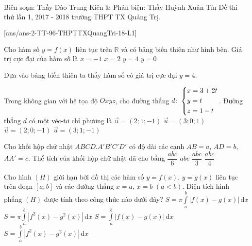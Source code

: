 
	\begin{name}
		{Biên soạn: Thầy Đào Trung Kiên \& Phản biện: Thầy Huỳnh Xuân Tín}
		{Đề thi thử lần 1, 2017 - 2018 trường THPT TX Quảng Trị.}
	\end{name}
	\setcounter{ex}{0}\setcounter{bt}{0}
	[ans/ans-2-TT-96-THPTTXQuangTri-18-L1]
	\begin{ex}%
		\immini
		{
			Cho hàm số $y=f(x)$ liên tục trên $\mathbb{R}$ và có bảng biến thiên như hình bên. Giá trị cực đại của hàm số là
			\choice
			{$x=-1$}
			{$x=2$}
			{\True $y=4$}
			{$y=0$}
		}
		{
		}
		\loigiai
		{
			Dựa vào bảng biến thiên ta thấy hàm số có giá trị cực đại $y=4$.
		}
	\end{ex}
	
	\begin{ex}%
		Trong không gian với hệ tọa độ $Oxyz$, cho đường thẳng $d\colon \left\{\begin{aligned}&x=3+2t\\&y=t\\&z=1-t\end{aligned}\right.$. Đường thẳng $d$ có một véc-tơ chỉ phương là
		\choice
		{\True $\overrightarrow{u}=(2;1;-1)$}
		{$\overrightarrow{u}=(3;0;1)$}
		{$\overrightarrow{u}=(2;0;-1)$}
		{$\overrightarrow{u}=(3;1;-1)$}
	\end{ex}
	
	\begin{ex}%
		Cho khối hộp chữ nhật $ABCD.A'B'C'D'$ có độ dài các cạnh $AB=a$, $AD=b$, $AA'=c$. Thể tích của khối hộp chữ nhật đã cho bằng
		\choice
		{$\dfrac{abc}{6}$}
		{\True $abc$}
		{$\dfrac{abc}{3}$}
		{$\dfrac{abc}{4}$}
		
	\end{ex}
	
	\begin{ex}%
		Cho hình $(H)$ giới hạn bởi đồ thị các hàm số $y=f(x)$, $y=g(x)$ liên tục trên đoạn $[a;b]$ và các đường thẳng $x=a$, $x=b$ $(a<b)$. Diện tích hình phẳng $(H)$ được tính theo công thức nào dưới đây?
		\choice
		{$S=\pi\displaystyle\int\limits_{a}^b\left| f(x)-g(x)\right|\mathrm{\,d}x$}
		{$S=\pi\displaystyle\int\limits_{a}^b\left| f^2(x)-g^2(x)\right|\mathrm{\,d}x$}
		{\True $S=\displaystyle\int\limits_{a}^b\left| f(x)-g(x)\right|\mathrm{\,d}x$}
		{$S=\displaystyle\int\limits_{a}^b\left| f^2(x)-g^2(x)\right|\mathrm{\,d}x$}
		\loigiai{
			
		}
	\end{ex}
	
